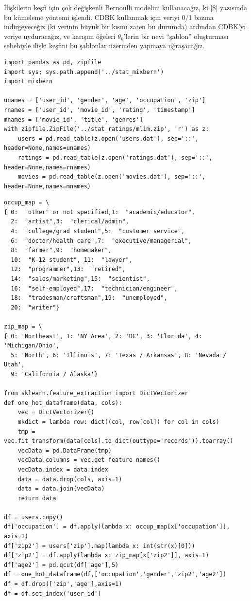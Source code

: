 \documentclass[12pt,fleqn]{article}\usepackage{../../common}
\begin{document}
İlişkilerin keşfi için çok değişkenli Bernoulli modelini kullanacağız, ki
[8] yazısında bu kümeleme yöntemi işlendi. CDBK kullanmak için veriyi 0/1
bazına indirgeyeceğiz (ki verinin büyük bir kısmı zaten bu durumda)
ardından CDBK'yı veriye uyduracağız, ve karışım öğeleri $\theta_k$'lerin
bir nevi ``şablon'' oluşturması sebebiyle ilişki keşfini bu şablonlar
üzerinden yapmaya uğraşacağız.

\begin{verbatim}
import pandas as pd, zipfile
import sys; sys.path.append('../stat_mixbern')
import mixbern

unames = ['user_id', 'gender', 'age', 'occupation', 'zip']
rnames = ['user_id', 'movie_id', 'rating', 'timestamp']
mnames = ['movie_id', 'title', 'genres']
with zipfile.ZipFile('../stat_ratings/ml1m.zip', 'r') as z:
    users = pd.read_table(z.open('users.dat'), sep='::', header=None,names=unames)
    ratings = pd.read_table(z.open('ratings.dat'), sep='::', header=None,names=rnames)
    movies = pd.read_table(z.open('movies.dat'), sep='::', header=None,names=mnames)
\end{verbatim}

\begin{verbatim}
occup_map = \
{ 0:  "other" or not specified,1:  "academic/educator",
  2:  "artist",3:  "clerical/admin",
  4:  "college/grad student",5:  "customer service",
  6:  "doctor/health care",7:  "executive/managerial",
  8:  "farmer",9:  "homemaker",
  10:  "K-12 student", 11:  "lawyer",
  12:  "programmer",13:  "retired",
  14:  "sales/marketing",15:  "scientist",
  16:  "self-employed",17:  "technician/engineer",
  18:  "tradesman/craftsman",19:  "unemployed",
  20:  "writer"}

zip_map = \
{ 0: 'Northeast', 1: 'NY Area', 2: 'DC', 3: 'Florida', 4: 'Michigan/Ohio', 
  5: 'North', 6: 'Illinois', 7: 'Texas / Arkansas', 8: 'Nevada / Utah', 
  9: 'California / Alaska'}

from sklearn.feature_extraction import DictVectorizer
def one_hot_dataframe(data, cols):
    vec = DictVectorizer()
    mkdict = lambda row: dict((col, row[col]) for col in cols)
    tmp = vec.fit_transform(data[cols].to_dict(outtype='records')).toarray()
    vecData = pd.DataFrame(tmp)
    vecData.columns = vec.get_feature_names()
    vecData.index = data.index
    data = data.drop(cols, axis=1)
    data = data.join(vecData)
    return data

df = users.copy()
df['occupation'] = df.apply(lambda x: occup_map[x['occupation']], axis=1)
df['zip2'] = users['zip'].map(lambda x: int(str(x)[0]))
df['zip2'] = df.apply(lambda x: zip_map[x['zip2']], axis=1)
df['age2'] = pd.qcut(df['age'],5)
df = one_hot_dataframe(df,['occupation','gender','zip2','age2'])
df = df.drop(['zip','age'],axis=1)
df = df.set_index('user_id')
\end{verbatim}
\end{document}
